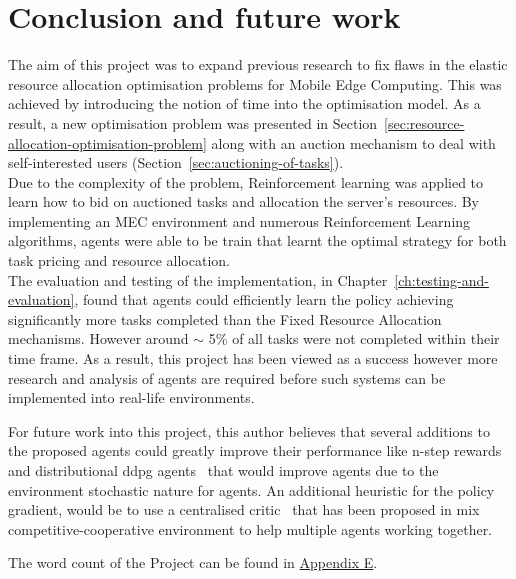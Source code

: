 \chapter{Conclusion and future work}
\label{ch:conclusion-and-future-work}
The aim of this project was to expand previous research to fix flaws in the elastic resource allocation optimisation
problems for Mobile Edge Computing. This was achieved by introducing the notion of time into the optimisation
model. As a result, a new optimisation problem was presented in Section~\ref{sec:resource-allocation-optimisation-problem}
along with an auction mechanism to deal with self-interested users (Section~\ref{sec:auctioning-of-tasks}). \\
Due to the complexity of the problem, Reinforcement learning was applied to learn how to bid on auctioned tasks and
allocation the server's resources. By implementing an MEC environment and numerous Reinforcement Learning algorithms,
agents were able to be train that learnt the optimal strategy for both task pricing and resource allocation. \\
The evaluation and testing of the implementation, in Chapter~\ref{ch:testing-and-evaluation}, found that agents could
efficiently learn the policy achieving significantly more tasks completed than the Fixed Resource Allocation mechanisms.
However around $\sim$ 5\% of all tasks were not completed within their time frame. As a result, this project has been
viewed as a success however more research and analysis of agents are required before such systems
can be implemented into real-life environments.

For future work into this project, this author believes that several additions to the proposed agents could greatly
improve their performance like n-step rewards~\citep{multi-step-dqn} and distributional ddpg
agents~\citep{distributional_dqn, d4pg} that would improve agents due to the environment stochastic nature for agents. An
additional heuristic for the policy gradient, would be to use a centralised critic~\citep{maddpg} that has been proposed
in mix competitive-cooperative environment to help multiple agents working together.

The word count of the Project can be found in \hyperref[app:project-management]{Appendix E}.
